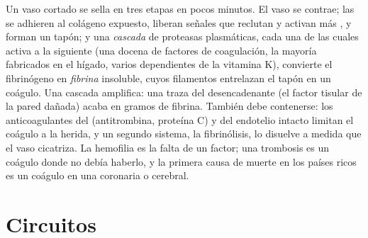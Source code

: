 \begin{proposition}[La hemostasia]\label{prop:b2:blood-circulation:clotting}
Un vaso cortado se sella en tres etapas en pocos minutos. El vaso se
contrae; las  se adhieren al colágeno expuesto, liberan señales
que reclutan y activan más , y forman un tapón; y una
\emph{cascada} de proteasas plasmáticas, cada una de las cuales activa a
la siguiente (una docena de factores de coagulación, la mayoría
fabricados en el hígado, varios dependientes de la vitamina K), convierte
el fibrinógeno en \emph{fibrina} insoluble, cuyos filamentos entrelazan el
tapón en un coágulo. Una cascada amplifica: una traza del
desencadenante (el factor tisular de la pared dañada) acaba en gramos de
fibrina. También debe contenerse: los anticoagulantes del 
(antitrombina, proteína C) y del endotelio intacto limitan el coágulo a la
herida, y un segundo sistema, la fibrinólisis, lo disuelve a medida que el
vaso cicatriza. La hemofilia es la falta de un factor; una trombosis es un
coágulo donde no debía haberlo, y la primera causa de muerte en los países
ricos es un coágulo en una  coronaria o cerebral.
\end{proposition}

\section{Circuitos}

